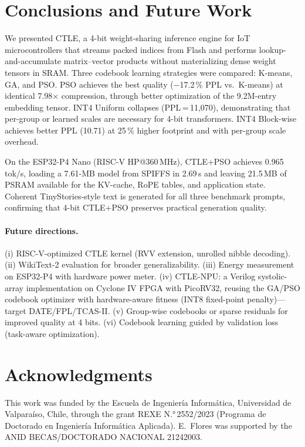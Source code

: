 \documentclass[lettersize,journal]{IEEEtran}
\begin{document}
\section{Conclusions and Future Work}
\label{sec:conclusions}

We presented CTLE, a 4-bit weight-sharing inference engine for IoT
microcontrollers that streams packed indices from Flash and performs
lookup-and-accumulate matrix--vector products without materializing dense
weight tensors in SRAM.
Three codebook learning strategies were compared: K-means, GA, and PSO.
PSO achieves the best quality ($-$17.2\,\% PPL vs.\ K-means) at identical
7.98$\times$ compression, through better optimization of the 9.2M-entry
embedding tensor.
INT4 Uniform collapses (PPL\,=\,11{,}070), demonstrating that per-group or
learned scales are necessary for 4-bit transformers.
INT4 Block-wise achieves better PPL (10.71) at 25\,\% higher footprint and with
per-group scale overhead.

On the ESP32-P4 Nano (RISC-V HP@360\,MHz), CTLE+PSO achieves 0.965\,tok/s,
loading a 7.61-MB model from SPIFFS in 2.69\,s and leaving 21.5\,MB of
PSRAM available for the KV-cache, RoPE tables, and application state.
Coherent TinyStories-style text is generated for all three benchmark prompts,
confirming that 4-bit CTLE+PSO preserves practical generation quality.

\paragraph{Future directions.}
(i) RISC-V-optimized CTLE kernel (RVV extension, unrolled nibble decoding).
(ii) WikiText-2 evaluation for broader generalizability.
(iii) Energy measurement on ESP32-P4 with hardware power meter.
(iv) CTLE-NPU: a Verilog systolic-array implementation on Cyclone IV FPGA
     with PicoRV32, reusing the GA/PSO codebook optimizer with hardware-aware
     fitness (INT8 fixed-point penalty)---target DATE/FPL/TCAS-II.
(v) Group-wise codebooks or sparse residuals for improved quality at 4 bits.
(vi) Codebook learning guided by validation loss (task-aware optimization).


\section*{Acknowledgments}
This work was funded by the Escuela de Ingeniería Informática,
Universidad de Valparaíso, Chile, through the grant REXE N.°\,2552/2023
(Programa de Doctorado en Ingeniería Informática Aplicada).
E.~Flores was supported by the ANID BECAS/DOCTORADO NACIONAL 21242003.
\end{document}
